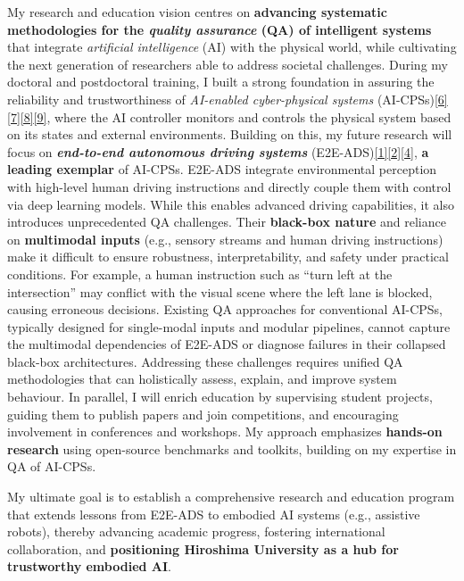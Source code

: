 \documentclass[12pt,a4paper]{article}
\begin{document}
My research and education vision centres on \textbf{advancing systematic methodologies for the \emph{quality assurance} (QA) of intelligent systems} that integrate \emph{artificial intelligence} (AI) with the physical world, while cultivating the next generation of researchers able to address societal challenges. During my doctoral and postdoctoral training, I built a strong foundation in assuring the reliability and trustworthiness of \emph{AI-enabled cyber-physical systems} (AI-CPSs)\hyperlink{paper6}{[6]}\hyperlink{paper7}{[7]}\hyperlink{paper8}{[8]}\hyperlink{paper9}{[9]}, where the AI controller monitors and controls the physical system based on its states and external environments. Building on this, my future research will focus on \textbf{\emph{end-to-end autonomous driving systems}} (E2E-ADS)\hyperlink{paper1}{[1]}\hyperlink{paper2}{[2]}\hyperlink{paper4}{[4]}, \textbf{a leading exemplar} of AI-CPSs. E2E-ADS integrate environmental perception with high-level human driving instructions and directly couple them with control via deep learning models. While this enables advanced driving capabilities, it also introduces unprecedented QA challenges. Their \textbf{black-box nature} and reliance on \textbf{multimodal inputs} (e.g., sensory streams and human driving instructions) make it difficult to ensure robustness, interpretability, and safety under practical conditions. For example, a human instruction such as “turn left at the intersection” may conflict with the visual scene where the left lane is blocked, causing erroneous decisions. Existing QA approaches for conventional AI-CPSs, typically designed for single-modal inputs and modular pipelines, cannot capture the multimodal dependencies of E2E-ADS or diagnose failures in their collapsed black-box architectures. Addressing these challenges requires unified QA methodologies that can holistically assess, explain, and improve system behaviour. In parallel, I will enrich education by supervising student projects, guiding them to publish papers and join competitions, and encouraging involvement in conferences and workshops. My approach emphasizes \textbf{hands-on research} using open-source benchmarks and toolkits, building on my expertise in QA of AI-CPSs.

My ultimate goal is to establish a comprehensive research and education program that extends lessons from E2E-ADS to embodied AI systems (e.g., assistive robots), thereby advancing academic progress, fostering international collaboration, and \textbf{positioning Hiroshima University as a hub for trustworthy embodied AI}.
\end{document}
